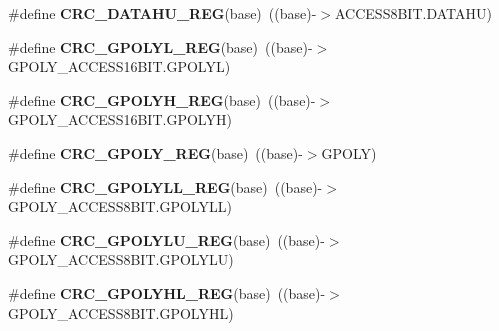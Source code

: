 \begin{DoxyCompactItemize}
\item 
\#define {\bfseries C\+R\+C\+\_\+\+D\+A\+T\+A\+H\+U\+\_\+\+R\+EG}(base)~((base)-\/$>$A\+C\+C\+E\+S\+S8\+B\+I\+T.\+D\+A\+T\+A\+HU)\hypertarget{group__CRC__Register__Accessor__Macros_ga0ff43e8e832829a862d36a8f33f08126}{}\label{group__CRC__Register__Accessor__Macros_ga0ff43e8e832829a862d36a8f33f08126}

\item 
\#define {\bfseries C\+R\+C\+\_\+\+G\+P\+O\+L\+Y\+L\+\_\+\+R\+EG}(base)~((base)-\/$>$G\+P\+O\+L\+Y\+\_\+\+A\+C\+C\+E\+S\+S16\+B\+I\+T.\+G\+P\+O\+L\+YL)\hypertarget{group__CRC__Register__Accessor__Macros_ga28de0343fb8a1934ead620d158bfa09d}{}\label{group__CRC__Register__Accessor__Macros_ga28de0343fb8a1934ead620d158bfa09d}

\item 
\#define {\bfseries C\+R\+C\+\_\+\+G\+P\+O\+L\+Y\+H\+\_\+\+R\+EG}(base)~((base)-\/$>$G\+P\+O\+L\+Y\+\_\+\+A\+C\+C\+E\+S\+S16\+B\+I\+T.\+G\+P\+O\+L\+YH)\hypertarget{group__CRC__Register__Accessor__Macros_gab28b160dd6192ee846e9399e4c9dea1b}{}\label{group__CRC__Register__Accessor__Macros_gab28b160dd6192ee846e9399e4c9dea1b}

\item 
\#define {\bfseries C\+R\+C\+\_\+\+G\+P\+O\+L\+Y\+\_\+\+R\+EG}(base)~((base)-\/$>$G\+P\+O\+LY)\hypertarget{group__CRC__Register__Accessor__Macros_gab762c4d55706670f1175d3f659e00c44}{}\label{group__CRC__Register__Accessor__Macros_gab762c4d55706670f1175d3f659e00c44}

\item 
\#define {\bfseries C\+R\+C\+\_\+\+G\+P\+O\+L\+Y\+L\+L\+\_\+\+R\+EG}(base)~((base)-\/$>$G\+P\+O\+L\+Y\+\_\+\+A\+C\+C\+E\+S\+S8\+B\+I\+T.\+G\+P\+O\+L\+Y\+LL)\hypertarget{group__CRC__Register__Accessor__Macros_gaaeeed4029e6a0189e90c623c2aa0879b}{}\label{group__CRC__Register__Accessor__Macros_gaaeeed4029e6a0189e90c623c2aa0879b}

\item 
\#define {\bfseries C\+R\+C\+\_\+\+G\+P\+O\+L\+Y\+L\+U\+\_\+\+R\+EG}(base)~((base)-\/$>$G\+P\+O\+L\+Y\+\_\+\+A\+C\+C\+E\+S\+S8\+B\+I\+T.\+G\+P\+O\+L\+Y\+LU)\hypertarget{group__CRC__Register__Accessor__Macros_ga6891ecb9421719bedd3b17a3f3c498c3}{}\label{group__CRC__Register__Accessor__Macros_ga6891ecb9421719bedd3b17a3f3c498c3}

\item 
\#define {\bfseries C\+R\+C\+\_\+\+G\+P\+O\+L\+Y\+H\+L\+\_\+\+R\+EG}(base)~((base)-\/$>$G\+P\+O\+L\+Y\+\_\+\+A\+C\+C\+E\+S\+S8\+B\+I\+T.\+G\+P\+O\+L\+Y\+HL)\hypertarget{group__CRC__Register__Accessor__Macros_ga78ffeec89894a1a292c17e03c05b68f5}{}\label{group__CRC__Register__Accessor__Macros_ga78ffeec89894a1a292c17e03c05b68f5}


\end{DoxyCompactItemize}

